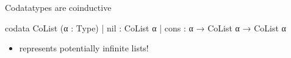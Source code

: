 \documentclass[t,12pt]{beamer}
\begin{document}
    


\begin{frame}[fragile]{Codatatypes are coinductive}
    \vfill
\begin{leancode}
codata CoList (α : Type)
  | nil  : CoList α
  | cons : α → CoList α → CoList α
\end{leancode}

\vfill

\pause{}

\begin{itemize}
    \item {} represents potentially infinite lists!
\end{itemize}

     
\end{frame}
    
\end{document}
